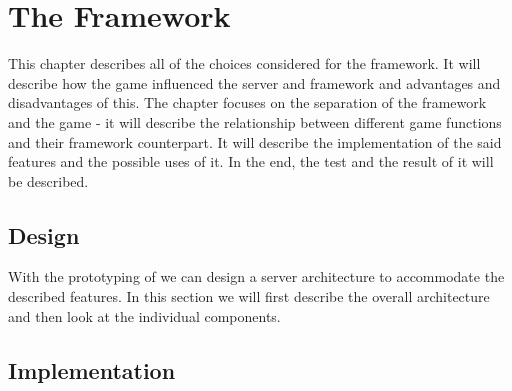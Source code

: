 \chapter{The Framework}

This chapter describes all of the choices considered for the framework. It will describe how the game influenced the server and framework and advantages and disadvantages of this. The chapter focuses on the separation of the framework and the game - it will describe the relationship between different game functions and their framework counterpart. It will describe the implementation of the said features and the possible uses of it. In the end, the test and the result of it will be described.

\section{Design}
With the prototyping of  we can design a server architecture to accommodate the described features. In this section we will first describe the overall architecture and then look at the individual components.

\section{Implementation}



